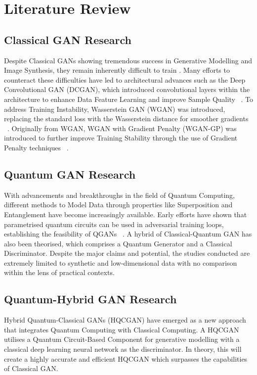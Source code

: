 \chapter{Literature Review}
\label{ch:review}
\vspace{2em}

\section{Classical GAN Research}

Despite Classical GANs showing tremendous success in Generative Modelling and Image Synthesis, they remain inherently difficult to train \cite{nokhwal2024bridging}. Many efforts to counteract these difficulties have led to architectural advances such as the Deep Convolutional GAN (DCGAN), which introduced convolutional layers within the architecture to enhance Data Feature Learning and improve Sample Quality ~\cite{radford2015dcgan}. To address Training Instability, Wasserstein GAN (WGAN) was introduced, replacing the standard loss with the Wasserstein distance for smoother gradients ~\cite{arjovsky2017wgan}. Originally from WGAN, WGAN with Gradient Penalty (WGAN-GP) was introduced to further improve Training Stability through the use of Gradient Penalty techniques ~\cite{gulrajani2017wgangp}.

\section{Quantum GAN Research}

With advancements and breakthroughs in the field of Quantum Computing, different methods to Model Data through properties like Superposition and Entanglement have become increasingly available. Early efforts have shown that parametrised quantum circuits can be used in adversarial training loops, establishing the feasibility of QGANs ~\cite{zoufal2019qgan}. A hybrid of Classical-Quantum GAN has also been theorised, which comprises a Quantum Generator and a Classical Discriminator. Despite the major claims and potential, the studies conducted are extremely limited to synthetic and low-dimensional data with no comparison within the lens of practical contexts.

\section{Quantum-Hybrid GAN Research}

Hybrid Quantum-Classical GANs (HQCGAN) have emerged as a new approach that integrates Quantum Computing with Classical Computing. A HQCGAN utilises a Quantum Circuit-Based Component for generative modelling with a classical deep learning neural network as the discriminator. In theory, this will create a highly accurate and efficient HQCGAN which surpasses the capabilities of Classical GAN.

